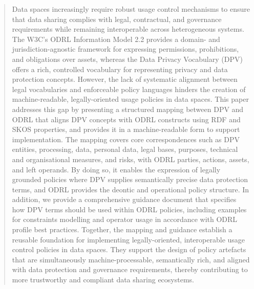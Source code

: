\documentclass{ceurart}
\begin{document}
\begin{abstract}
Data spaces increasingly require robust usage control mechanisms to ensure that data sharing complies with legal, contractual, and governance requirements while remaining interoperable across heterogeneous systems. The W3C's ODRL Information Model 2.2 provides a domain- and jurisdiction-agnostic framework for expressing permissions, prohibitions, and obligations over assets, whereas the Data Privacy Vocabulary (DPV) offers a rich, controlled vocabulary for representing privacy and data protection concepts.
However, the lack of systematic alignment between legal vocabularies and enforceable policy languages hinders the creation of machine-readable, legally-oriented usage policies in data spaces.
This paper addresses this gap by presenting a structured mapping between DPV and ODRL that aligns DPV concepts with ODRL constructs using RDF and SKOS properties, and provides it in a machine-readable form to support implementation.
The mapping covers core correspondences such as DPV entities, processing, data, personal data, legal bases, purposes, technical and organisational measures, and risks, with ODRL parties, actions, assets, and left operands. 
By doing so, it enables the expression of legally grounded policies where DPV supplies semantically precise data protection terms, and ODRL provides the deontic and operational policy structure.
In addition, we provide a comprehensive guidance document that specifies how DPV terms should be used within ODRL policies, including examples for constraints modelling and operator usage in accordance with ODRL profile best practices. 
Together, the mapping and guidance establish a reusable foundation for implementing legally-oriented, interoperable usage control policies in data spaces. They support the design of policy artefacts that are simultaneously machine-processable, semantically rich, and aligned with data protection and governance requirements, thereby contributing to more trustworthy and compliant data sharing ecosystems.
\end{abstract}
\end{document}
